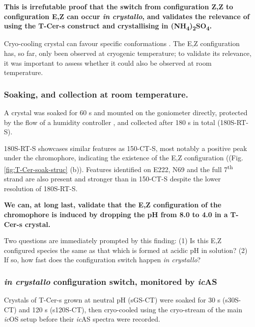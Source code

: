 \vspace{2mm}

\textbf{This is irrefutable proof that the switch from configuration Z,Z to configuration E,Z can occur \textit{in crystallo}, and validates the relevance of using the T-Cer-s construct and crystallising in  (NH\textsubscript{4})\textsubscript{2}SO\textsubscript{4}. }

Cryo-cooling crystal can favour specific conformations \parencite{fraserHiddenAlternateStructures2009,fraserAccessingProteinConformational2011}. The E,Z configuration has, so far, only been observed at cryogenic temperature; to validate its relevance, it was important to assess whether it could also be observed at room temperature. 

\subsubsection{Soaking, and collection at room temperature.}

A crystal was soaked for 60 s and mounted on the goniometer directly, protected by the flow of a humidity controller \parencite{sanchez-weatherbyImprovingDiffractionHumidity2009}, and collected after 180 s in total (180S-RT-S).

180S-RT-S showcases similar features as 150-CT-S, most notably a positive peak under the chromophore, indicating the existence of the E,Z configuration  ((Fig. \ref{fig:T-Cer-soak-struc} (b)). Features identified on E222, N69 and the full 7\textsuperscript{th} strand are also present and stronger than in 150-CT-S despite the lower resolution of 180S-RT-S.

\textbf{We can, at long last, validate that the E,Z configuration of the chromophore is induced by dropping the pH from 8.0 to 4.0 in a T-Cer-s crystal. }

Two questions are immediately prompted by this finding: (1) Is this E,Z configured species the same as that which is formed at acidic pH in solution? (2) If so, how fast does the configuration switch happen \textit{in crystallo}?

\subsubsection{\textit{in crystallo} configuration switch, monitored by \textit{ic}AS}

Crystals of T-Cer-s grown at neutral pH (sGS-CT) were soaked for 30 s (s30S-CT) and 120 s (s120S-CT), then cryo-cooled using the cryo-stream of the main \textit{ic}OS setup before their \textit{ic}AS spectra were recorded. 
 
